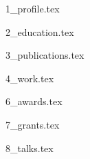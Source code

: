 \documentclass[letterpaper,11pt]{article}
\begin{document}

{1_profile.tex}

{2_education.tex}

{3_publications.tex}

{4_work.tex}


{6_awards.tex}

{7_grants.tex}

{8_talks.tex}



\end{document}
